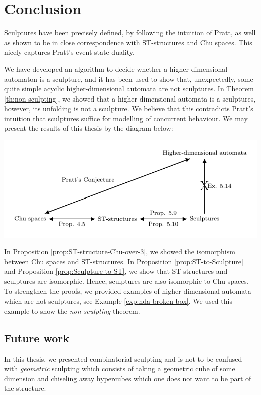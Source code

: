 \chapter{Conclusion}
    Sculptures have been precisely defined, by following the intuition of Pratt, as well as shown to be in close correspondence with ST-structures and Chu spaces. This nicely captures Pratt's event-state-duality.
    
    We have developed an algorithm to decide whether a higher-dimensional automaton is a sculpture, and it has been used to show that, unexpectedly, some quite simple acyclic higher-dimensional automata are not sculptures. In Theorem \ref{th:non-sculpting}, we showed that a higher-dimensional automata is a sculptures, however, its unfolding is not a sculpture. We believe that this contradicts Pratt's intuition that sculptures suffice for modelling of concurrent behaviour. We may present the results of this thesis by the diagram below:
    
    \begin{center}
        \includegraphics[scale=1]{Figures/4.Relationship-with-other-models-of-concurrency/Chu-spaces-and-ST-structures/argument-diagram.pdf}
    \end{center}
    
    In Proposition \ref{prop:ST-structure-Chu-over-3}, we showed the isomorphism between Chu spaces and ST-structures. In Proposition \ref{prop:ST-to-Sculpture} and Proposition \ref{prop:Sculpture-to-ST}, we show that ST-structures and sculptures are isomorphic. Hence, sculptures are also isomorphic to Chu spaces. To strengthen the proofs, we provided examples of higher-dimensional automata which are not sculptures, see Example \ref{exp:hda-broken-box}. We used this example to show the \emph{non-sculpting} theorem.
    
\section*{Future work}
    In this thesis, we presented combinatorial sculpting and is not to be confused with \emph{geometric} sculpting which consists of taking a geometric cube of some dimension and chiseling away hypercubes which one does not want to be part of the structure.
    
